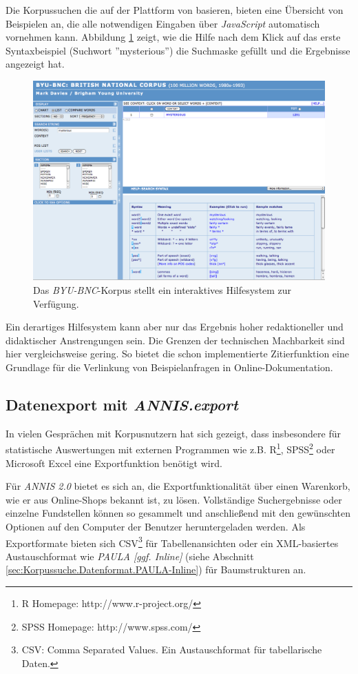 Die Korpussuchen die auf der Plattform von \citep{davies2005ijcl} basieren, bieten eine Übersicht von Beispielen an, die alle notwendigen Eingaben über \emph{JavaScript} automatisch vornehmen kann. Abbildung \ref{fig:View.Help} zeigt, wie die Hilfe nach dem Klick auf das erste Syntaxbeispiel (Suchwort ''mysterious'') die Suchmaske gefüllt und die Ergebnisse angezeigt hat.

\begin{figure}[H]
	\centering
	\includegraphics*[width=1.0\textwidth]{figures/DA/Screenshot-View-Hilfe.jpg}
	\caption{Das \emph{BYU-BNC}-Korpus stellt ein interaktives Hilfesystem zur Verfügung.}
	\label{fig:View.Help}
\end{figure}

Ein derartiges Hilfesystem kann aber nur das Ergebnis hoher redaktioneller und didaktischer Anstrengungen sein. Die Grenzen der technischen Machbarkeit sind hier vergleichsweise gering. So bietet die schon implementierte Zitierfunktion eine Grundlage für die Verlinkung von Beispielanfragen in Online-Dokumentation.

\subsection{Datenexport mit \emph{ANNIS.export}}

In vielen Gesprächen mit Korpusnutzern hat sich gezeigt, dass insbesondere für statistische Auswertungen mit externen Programmen wie z.B. R\footnote{R Homepage: http://www.r-project.org/}, SPSS\footnote{SPSS Homepage: http://www.spss.com/} oder Microsoft Excel eine Exportfunktion benötigt wird.

Für \emph{ANNIS 2.0} bietet es sich an, die Exportfunktionalität über einen Warenkorb, wie er aus Online-Shops bekannt ist, zu lösen. Vollständige Suchergebnisse oder einzelne Fundstellen können so gesammelt und anschließend mit den gewünschten Optionen auf den Computer der Benutzer heruntergeladen werden. Als Exportformate bieten sich CSV\footnote{CSV: Comma Separated Values. Ein Austauschformat für tabellarische Daten.}  für Tabellenansichten oder ein XML-basiertes Austauschformat wie \emph{PAULA [ggf. Inline]} (siehe Abschnitt \ref{sec:Korpussuche.Datenformat.PAULA-Inline}) für Baumstrukturen an.

